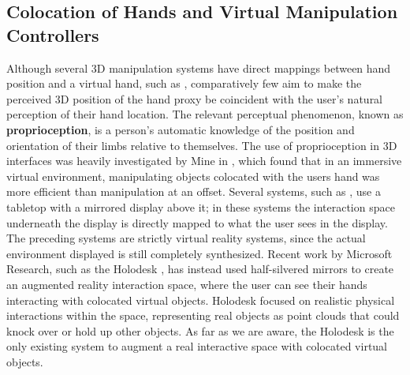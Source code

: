 \documentclass[pageno]{jpaper}
\begin{document}
\subsection{Colocation of Hands and Virtual Manipulation Controllers}
Although several 3D manipulation systems have direct mappings between hand position and a virtual hand, such as \cite{poupyrev1996go},
comparatively few aim to make the perceived 3D position of the hand proxy be coincident with the user's natural perception of their
hand location. The relevant perceptual phenomenon, known as {\bf proprioception}, is a person's automatic knowledge of the position and orientation of their
limbs relative to themselves. The use of proprioception in 3D interfaces was heavily investigated by Mine in \cite{mine1997exploiting}, which found that
in an immersive virtual environment, manipulating objects colocated with the users hand was more efficient than manipulation at an offset. Several systems,
such as \cite{mulder2002personal, prachyabrued2011dropping}, use a tabletop with a mirrored display above it; in these systems the interaction space underneath
the display is directly mapped to what the user sees in the display. The preceding systems are strictly virtual reality systems, since the actual environment displayed
is still completely synthesized. Recent work by Microsoft Research, such as the Holodesk \cite{holodesk}, has instead used half-silvered mirrors to create an augmented reality
interaction space, where the user can see their hands interacting with colocated virtual objects. Holodesk focused on realistic physical interactions within the space,
representing real objects as point clouds that could knock over or hold up other objects. As far as we are aware, the Holodesk is the only existing system to augment a real
interactive space with colocated virtual objects.
\end{document}
